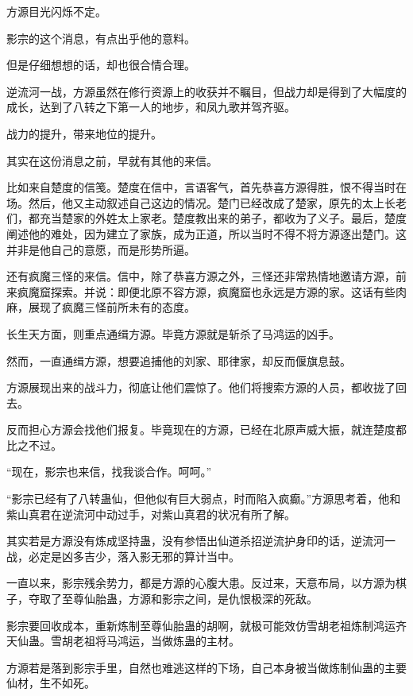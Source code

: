 
\begin{this_body}

方源目光闪烁不定。

影宗的这个消息，有点出乎他的意料。

但是仔细想想的话，却也很合情合理。

逆流河一战，方源虽然在修行资源上的收获并不瞩目，但战力却是得到了大幅度的成长，达到了八转之下第一人的地步，和凤九歌并驾齐驱。

战力的提升，带来地位的提升。

其实在这份消息之前，早就有其他的来信。

比如来自楚度的信笺。楚度在信中，言语客气，首先恭喜方源得胜，恨不得当时在场。然后，他又主动叙述自己这边的情况。楚门已经改成了楚家，原先的太上长老们，都充当楚家的外姓太上家老。楚度教出来的弟子，都收为了义子。最后，楚度阐述他的难处，因为建立了家族，成为正道，所以当时不得不将方源逐出楚门。这并非是他自己的意愿，而是形势所逼。

还有疯魔三怪的来信。信中，除了恭喜方源之外，三怪还非常热情地邀请方源，前来疯魔窟探索。并说：即便北原不容方源，疯魔窟也永远是方源的家。这话有些肉麻，展现了疯魔三怪前所未有的态度。

长生天方面，则重点通缉方源。毕竟方源就是斩杀了马鸿运的凶手。

然而，一直通缉方源，想要追捕他的刘家、耶律家，却反而偃旗息鼓。

方源展现出来的战斗力，彻底让他们震惊了。他们将搜索方源的人员，都收拢了回去。

反而担心方源会找他们报复。毕竟现在的方源，已经在北原声威大振，就连楚度都比之不过。

“现在，影宗也来信，找我谈合作。呵呵。”

“影宗已经有了八转蛊仙，但他似有巨大弱点，时而陷入疯癫。”方源思考着，他和紫山真君在逆流河中动过手，对紫山真君的状况有所了解。

其实若是方源没有炼成坚持蛊，没有参悟出仙道杀招逆流护身印的话，逆流河一战，必定是凶多吉少，落入影无邪的算计当中。

一直以来，影宗残余势力，都是方源的心腹大患。反过来，天意布局，以方源为棋子，夺取了至尊仙胎蛊，方源和影宗之间，是仇恨极深的死敌。

影宗要回收成本，重新炼制至尊仙胎蛊的胡啊，就极可能效仿雪胡老祖炼制鸿运齐天仙蛊。雪胡老祖将马鸿运，当做炼蛊的主材。

方源若是落到影宗手里，自然也难逃这样的下场，自己本身被当做炼制仙蛊的主要仙材，生不如死。


\end{this_body}
